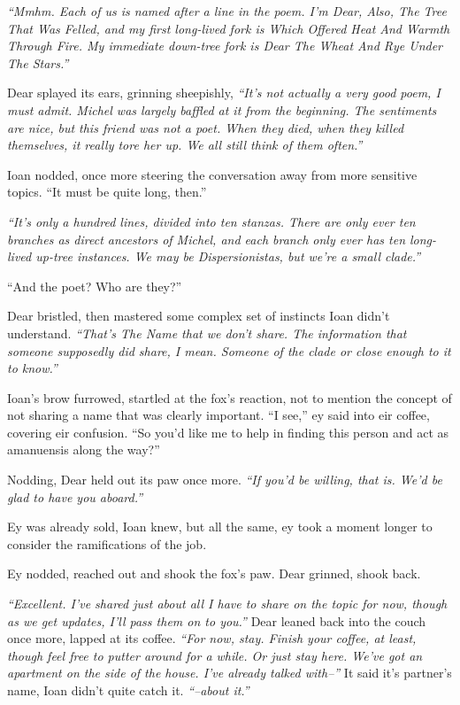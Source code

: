 \emph{``Mmhm. Each of us is named after a line in the poem. I'm Dear, Also, The Tree That Was Felled, and my first long-lived fork is Which Offered Heat And Warmth Through Fire. My immediate down-tree fork is Dear The Wheat And Rye Under The Stars.''}

Dear splayed its ears, grinning sheepishly, \emph{``It's not actually a very good poem, I must admit. Michel was largely baffled at it from the beginning. The sentiments are nice, but this friend was not a poet. When they died, when they killed themselves, it really tore her up. We all still think of them often.''}

Ioan nodded, once more steering the conversation away from more sensitive topics. ``It must be quite long, then.''

\emph{``It's only a hundred lines, divided into ten stanzas. There are only ever ten branches as direct ancestors of Michel, and each branch only ever has ten long-lived up-tree instances. We may be Dispersionistas, but we're a small clade.''}

``And the poet? Who are they?''

Dear bristled, then mastered some complex set of instincts Ioan didn't understand. \emph{``That's The Name that we don't share. The information that someone supposedly did share, I mean. Someone of the clade or close enough to it to know.''}

Ioan's brow furrowed, startled at the fox's reaction, not to mention the concept of not sharing a name that was clearly important. ``I see,'' ey said into eir coffee, covering eir confusion. ``So you'd like me to help in finding this person and act as amanuensis along the way?''

Nodding, Dear held out its paw once more. \emph{``If you'd be willing, that is. We'd be glad to have you aboard.''}

Ey was already sold, Ioan knew, but all the same, ey took a moment longer to consider the ramifications of the job.

Ey nodded, reached out and shook the fox's paw. Dear grinned, shook back.

\emph{``Excellent. I've shared just about all I have to share on the topic for now, though as we get updates, I'll pass them on to you.''} Dear leaned back into the couch once more, lapped at its coffee. \emph{``For now, stay. Finish your coffee, at least, though feel free to putter around for a while. Or just stay here. We've got an apartment on the side of the house. I've already talked with--''} It said it's partner's name, Ioan didn't quite catch it. \emph{``--about it.''}

